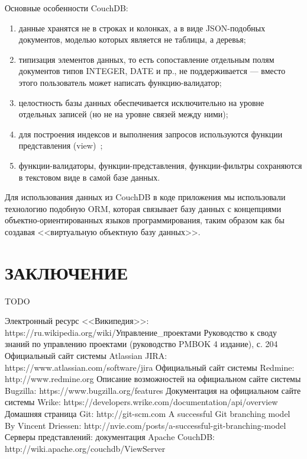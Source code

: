 \documentclass[14pt, a4paper]{extreport}
\begin{document}
Основные особенности CouchDB:
\begin{enumerate}
\item данные хранятся не в строках и колонках, а в виде JSON-подобных документов,
  моделью которых является не таблицы, а деревья;
\item типизация элементов данных, то есть сопоставление отдельным полям документов типов INTEGER, DATE и пр.,
  не поддерживается — вместо этого пользователь может написать функцию-валидатор;
\item целостность базы данных обеспечивается исключительно на уровне отдельных записей
  (но не на уровне связей между ними);
\item для построения индексов и выполнения запросов используются функции представления (view)~\cite{couchdb_doc};
\item функции-валидаторы, функции-представления, функции-фильтры сохраняются в текстовом виде в самой базе данных.
\end{enumerate}

Для использования данных из CouchDB в коде приложения мы использовали технологию подобную ORM,
которая связывает базу данных с концепциями объектно-ориентированных языков программирования,
таким образом как бы создавая <<виртуальную объектную базу данных>>.

\chapter{\MakeTextUppercase{Заключение}}
TODO

\newpage
\clearpage
%
\begin{thebibliography}{}
 Электронный ресурс <<Википедия>>: \\https://ru.wikipedia.org/wiki/Управление\_проектами
 Руководство к своду знаний по управлению проектами (руководство PMBOK 4 издание), с. 204
 Официальный сайт системы Atlassian JIRA: https://www.atlassian.com/software/jira
 Официальный сайт системы Redmine: http://www.redmine.org
 Описание возможностей на официальном сайте системы Bugzilla: https://www.bugzilla.org/features
 Документация на официальном сайте системы Wrike: https://developers.wrike.com/documentation/api/overview
 Домашняя страница Git: http://git-scm.com
 A successful Git branching model By Vincent Driessen: http://nvie.com/posts/a-successful-git-branching-model
 Серверы представлений: документация Apache CouchDB: http://wiki.apache.org/couchdb/ViewServer
\end{thebibliography}
\end{document}
